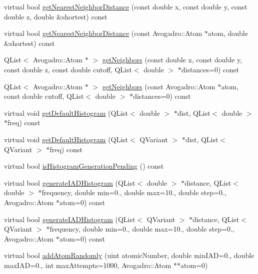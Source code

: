\begin{DoxyCompactItemize}
\item 
virtual bool \hyperlink{classGlobalSearch_1_1Structure_af90032040343059ebbc91ac294a0a020}{get\-Nearest\-Neighbor\-Distance} (const double x, const double y, const double z, double \&shortest) const 
\item 
virtual bool \hyperlink{classGlobalSearch_1_1Structure_af7280b04c20689040bb7bc69005aef49}{get\-Nearest\-Neighbor\-Distance} (const Avogadro\-::\-Atom $\ast$atom, double \&shortest) const 
\item 
Q\-List$<$ Avogadro\-::\-Atom $\ast$ $>$ \hyperlink{classGlobalSearch_1_1Structure_a741bc226576a6aebdc72573afec08fe2}{get\-Neighbors} (const double x, const double y, const double z, const double cutoff, Q\-List$<$ double $>$ $\ast$distances=0) const 
\item 
Q\-List$<$ Avogadro\-::\-Atom $\ast$ $>$ \hyperlink{classGlobalSearch_1_1Structure_af84f72e94d8961a8804ff38b0c20b785}{get\-Neighbors} (const Avogadro\-::\-Atom $\ast$atom, const double cutoff, Q\-List$<$ double $>$ $\ast$distances=0) const 
\item 
virtual void \hyperlink{classGlobalSearch_1_1Structure_a668fcf6ecb33ad5fd3ef9963dd059ce0}{get\-Default\-Histogram} (Q\-List$<$ double $>$ $\ast$dist, Q\-List$<$ double $>$ $\ast$freq) const 
\item 
virtual void \hyperlink{classGlobalSearch_1_1Structure_a15748e6ccd1971f70dcf24d26a07388f}{get\-Default\-Histogram} (Q\-List$<$ Q\-Variant $>$ $\ast$dist, Q\-List$<$ Q\-Variant $>$ $\ast$freq) const 
\item 
virtual bool \hyperlink{classGlobalSearch_1_1Structure_a18edce7ebc0e1f5d0f939369a737c778}{is\-Histogram\-Generation\-Pending} () const 
\item 
virtual bool \hyperlink{classGlobalSearch_1_1Structure_a39c00be4b7081dea0963a9183c5d8d36}{generate\-I\-A\-D\-Histogram} (Q\-List$<$ double $>$ $\ast$distance, Q\-List$<$ double $>$ $\ast$frequency, double min=0., double max=10., double step=0., Avogadro\-::\-Atom $\ast$atom=0) const 
\item 
virtual bool \hyperlink{classGlobalSearch_1_1Structure_a6009cbdb3990eba689cbdd27aa0305ea}{generate\-I\-A\-D\-Histogram} (Q\-List$<$ Q\-Variant $>$ $\ast$distance, Q\-List$<$ Q\-Variant $>$ $\ast$frequency, double min=0., double max=10., double step=0., Avogadro\-::\-Atom $\ast$atom=0) const 
\item 
virtual bool \hyperlink{classGlobalSearch_1_1Structure_a8e0db651a3a48cd249f13f3ae0ca2b68}{add\-Atom\-Randomly} (uint atomic\-Number, double min\-I\-A\-D=0., double max\-I\-A\-D=0., int max\-Attempts=1000, Avogadro\-::\-Atom $\ast$$\ast$atom=0)
$$
\end{DoxyCompactItemize}
